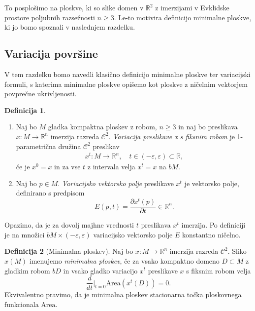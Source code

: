 \documentclass[12pt,a4paper,twoside]{article}
\theoremstyle{definition} %
\newtheorem{definicija}{Definicija}[section]
\theoremstyle{plain} %
\numberwithin{equation}{section}  %
\newcommand{\R}{\mathbb R}
\begin{document}
To posplošimo na ploskve, ki so slike domen v $\R^2$ z imerzijami v Evklidske prostore poljubnih razsežnosti $n \geq 3$. Le-to motivira definicijo minimalne ploskve, ki jo bomo spoznali v naslednjem razdelku.

\subsection{Variacija površine}
V tem razdelku bomo navedli klasično definicijo minimalne ploskve ter variacijski formuli, s katerima minimalne ploskve opišemo kot ploskve z ničelnim vektorjem povprečne ukrivljenosti.
%
\begin{definicija} \label{def:variacija}
\begin{enumerate}
\item
Naj bo $M$ gladka kompaktna ploskev z robom, $n \geq 3$ in naj bo preslikava $x \colon M \to \R^{n}$ imerzija razreda $\mathcal{C}^2$. \emph{Variacija preslikave x s fiksnim robom} je 1-parametrična družina $\mathcal{C}^2$ preslikav 
\begin{gather}
x^{t} \colon M \to \R^{n}, \quad t \in (-\varepsilon, \varepsilon) \subset \R,
\end{gather}
če je $x^0 = x$ in za vse $t$ z intervala velja $x^{t} = x$ na $bM$.
%
\item
Naj bo $p \in M$. \emph{Variacijsko vektorsko polje} preslikave $x^{t}$ je vektorsko polje, definirano s predpisom
\begin{equation}
E(p,t) = \frac{\partial{x^t(p)}}{\partial{t}} \in \R^{n}.
\end{equation}
\end{enumerate}
\end{definicija}

Opazimo, da je za dovolj majhne vrednosti $t$ preslikava $x^{t}$ imerzija.
Po definiciji je na množici $bM \times (-\varepsilon, \varepsilon)$ variacijsko vektorsko polje $E$ konstantno ničelno.

\begin{definicija} [Minimalna ploskev] \label{def:min-ploskev}
Naj bo $x \colon M \to \R^{n}$ imerzija razreda $\mathcal{C}^2$. Sliko $x(M)$ imenujemo \emph{minimalna ploskev}, če za vsako kompaktno domeno $D \subset M$ z gladkim robom $bD$ in vsako gladko variacijo $x^{t}$ preslikave $x$ s fiksnim robom velja
\begin{equation} \label{eq:1-var-ploščine}
\frac{d}{dt} \Big|_{t=0} \text{Area} \left(x^{t}(D)\right) = 0.
\end{equation}
Ekvivalentno pravimo, da je minimalna ploskev stacionarna točka ploskovnega funkcionala $\text{Area}$.
\end{definicija}
\end{document}
